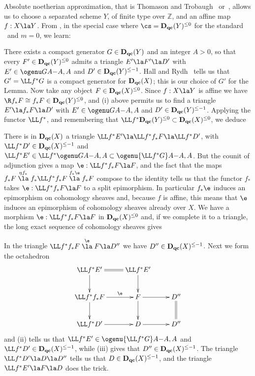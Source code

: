 \documentclass[11pt]{amsart}
\newcommand{\zz}{{\mathbb Z}}
\newcommand{\Dqc}{{\mathbf D_{\text{\bf qc}}}}
\begin{document}
\prf
Absolute noetherian approximation,
that is
Thomason and Trobaugh~\cite[Theorem~C.9]{ThomTro}
or~\cite[Tags 01YT and 081A]{stacks-project},
allows us to choose a separated
scheme $Y$, of finite type over $\zz$, and an affine
map $f:X\la Y$. 
From \cite[Definition~5.2 and Theorem~5.8]{Neeman17}, in the
special case where $\cs=\Dqc(Y)^{\leq0}$ for
the standard \tstr\ and $m=0$, we learn:
\be
\item
There exists a compact generator $G\in\Dqc(Y)$ and an integer $A>0$, so that
every $F'\in\Dqc(Y)^{\leq0}$ admits a triangle $E'\la F'\la D'$ with
$E'\in\ogenu GA{-A,A}$ and $D'\in\Dqc(Y)^{\leq-1}$.
\setcounter{enumiv}{\value{enumi}}
\ee
Hall and Rydh~\cite[Lemma~8.2]{Hall-Rydh13} tells us that
$G'=\LL f^*G$
is a compact generator for $\Dqc(X)$;
this is our choice of $G'$ for the Lemma.
Now take any object $F\in\Dqc(X)^{\leq0}$. Since
$f:X\la Y$ is affine we have $\R f_*F\cong f_*F\in\Dqc(Y)^{\leq0}$, and (i)
above permits us to find a triangle
$E'\la f_*F\la D'$ with $E'\in\ogenu GA{-A,A}$ and $D'\in\Dqc(Y)^{\leq-1}$.
Applying the functor $\LL f^*$, and remembering that
$\LL f^*\Dqc(Y)^{\leq0}\subset\Dqc(X)^{\leq0}$, we deduce
\be
\setcounter{enumi}{\value{enumiv}}
\item
There is in $\Dqc(X)$ a triangle
$\LL f^*E'\la \LL f^*f_* F\la\LL f^*D'$, with $\LL f^*D'\in\Dqc(X)^{\leq-1}$
and $\LL f^*E'\in\LL f^*\ogenu GA{-A,A}\subset\ogenu{\LL f^*G}A{-A,A}$.
\setcounter{enumiv}{\value{enumi}}
\ee
But the counit of adjunction gives a map $\e:\LL f^*f_*F\la F$,
and the fact that the maps
$f_*F\stackrel{\eta f_*}\la f_*\LL f^* f_*F \stackrel{ f_*\e}\la f_*F$
compose to the identity tells us that the functor
$f_*$ takes $\e:\LL f^*f_*F\la F$ to a split epimorphism.
In particular $f_*\e$ induces an epimorphism on
cohomology sheaves and, because $f$ is affine, this means that
$\e$ induces an epimorphism of cohomology sheaves already over
$X$. We have a morphism
$\e:\LL f^*f_*F\la F$ in $\Dqc(X)^{\leq0}$ and, if we complete
it to a triangle, the long exact sequence of cohomology
sheaves gives
\be
\setcounter{enumi}{\value{enumiv}}
\item
In the triangle
$\LL f^* f_*F \stackrel{ \e}\la F \la D''$ we have $D''\in\Dqc(X)^{\leq-1}$.
\setcounter{enumiv}{\value{enumi}}
\ee
Next we form the octahedron
\[\xymatrix{
\LL f^*E'\ar[d]\ar@{=}[r] &\LL f^*E'\ar[d] & \\
\LL f^*f_*F\ar[d]\ar[r]^-\e & F\ar[d] \ar[r] & D''\ar@{=}[d]\\
\LL f^*D' \ar[r] &D\ar[r] & D''
}\]
and (ii) tells us that $\LL f^*E'\in\ogenu{\LL f^*G}A{-A,A}$ and
$\LL f^*D'\in\Dqc(X)^{\leq-1}$, while (iii) gives that $D''\in\Dqc(X)^{\leq-1}$.
The triangle $\LL f^*D'\la D\la D''$ tells us that $D\in\Dqc(X)^{\leq-1}$,
and the triangle $\LL f^*E'\la F\la D$ does the trick.
\eprf
\end{document}

